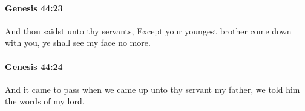 		\paragraph{Genesis 44:23} %
			\label{GENESIS-44-23}

			And thou saidst unto thy servants, Except your youngest brother come down with you, ye shall see my face no more.


		\paragraph{Genesis 44:24} %
			\label{GENESIS-44-24}

			And it came to pass when we came up unto thy servant my father, we told him the words of my lord.


